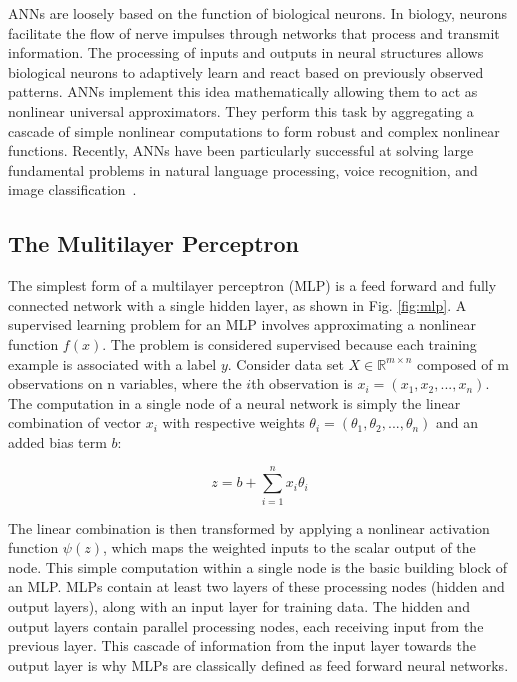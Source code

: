ANNs are loosely based on the function of biological neurons. In biology, neurons facilitate the flow of nerve impulses through networks that process and transmit information. The processing of inputs and outputs in neural structures allows biological neurons to adaptively learn and react based on previously observed patterns. ANNs implement this idea mathematically allowing them to act as nonlinear universal approximators. They perform this task by aggregating a cascade of simple nonlinear computations to form robust and complex nonlinear functions. Recently, ANNs have been particularly successful at solving large fundamental problems in natural language processing, voice recognition, and image classification~\cite{collobert2011natural, hinton2012deep, cirecsan2012multi}. 

\subsection{The Mulitilayer Perceptron}

The simplest form of a multilayer perceptron (MLP) is a feed forward and fully connected network with a single hidden layer, as shown in Fig. \ref{fig:mlp}. A supervised learning problem for an MLP involves approximating a nonlinear function $f(x)$. The problem is considered supervised because each training example is associated with a label $y$. Consider data set $X \in \mathbb{R}^{m\times n} $ composed of m observations on n variables, where the $i$th observation is $x_i = (x_1,x_2,...,x_n)$. The computation in a single node of a neural network is simply the linear combination of vector $x_i$ with respective weights $\theta_i = (\theta_1,\theta_2,...,\theta_n)$ and an added bias term $b$:

    \begin{equation} \label{eq:lincomb}
        z = b + \sum_{i=1}^{n}  x_i \theta_i
    \end{equation}

The linear combination is then transformed by applying a nonlinear activation function $\psi(z)$, which maps the weighted inputs to the scalar output of the node. This simple computation within a single node is the basic building block of an MLP. MLPs contain at least two layers of these processing nodes (hidden and output layers), along with an input layer for training data. The hidden and output layers contain parallel processing nodes, each receiving input from the previous layer. This cascade of information from the input layer towards the output layer is why MLPs are classically defined as feed forward neural networks. 

